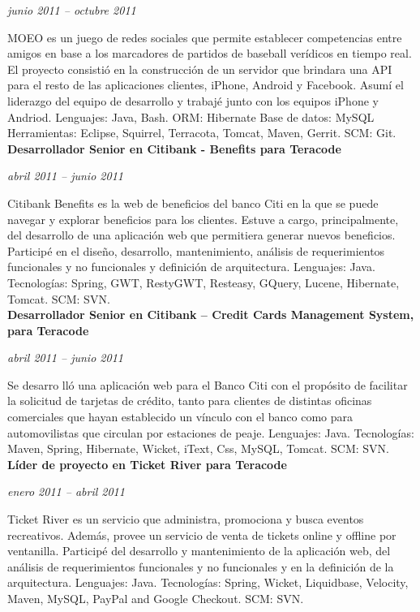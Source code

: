 \documentclass[a4paper,11pt]{article}
\begin{document}
\noindent \emph{junio 2011 –  octubre 2011}

\noindent MOEO es un juego de redes sociales que permite establecer
competencias entre amigos en base a los marcadores de partidos de baseball
verídicos en tiempo real.  El proyecto consistió en la construcción de un
servidor que brindara una API para el resto de las aplicaciones clientes,
iPhone, Android y Facebook.
Asumí el liderazgo del equipo de desarrollo y trabajé junto con los equipos
iPhone y Andriod.  Lenguajes: Java, Bash.
ORM: Hibernate
Base de datos: MySQL
Herramientas: Eclipse, Squirrel, Terracota, Tomcat, Maven, Gerrit.
SCM: Git. \\

\noindent \textbf{Desarrollador Senior en Citibank - Benefits para Teracode}

\noindent \emph{abril 2011 – junio 2011}

\noindent Citibank Benefits es la web de beneficios del banco Citi en la que se
puede navegar y explorar beneficios para los clientes.  Estuve a cargo,
principalmente, del desarrollo de una aplicación web que permitiera generar
nuevos beneficios. 
Participé en el diseño, desarrollo, mantenimiento, análisis de requerimientos
funcionales y no funcionales y definición de arquitectura.  Lenguajes: Java.
Tecnologías: Spring, GWT, RestyGWT, Resteasy, GQuery, Lucene, Hibernate, Tomcat.
SCM: SVN. \\ 

\noindent \textbf{Desarrollador Senior en Citibank – Credit Cards Management
System, para Teracode}

\noindent \emph{abril 2011 –  junio 2011}

\noindent Se desarro lló una aplicación web para el Banco Citi con el propósito
de facilitar la solicitud de tarjetas de crédito, tanto para clientes de
distintas oficinas comerciales que hayan establecido un vínculo con el banco
como para automovilistas que circulan por estaciones de peaje.  Lenguajes:
Java.
Tecnologías: Maven, Spring, Hibernate, Wicket, iText, Css, MySQL, Tomcat.
SCM: SVN. \\ 

\noindent \textbf{Líder de proyecto en Ticket River para Teracode}

\noindent \emph{enero 2011 –  abril 2011}

\noindent Ticket River es un servicio que administra, promociona y busca
eventos recreativos. Además, provee un servicio de venta de tickets online y
offline por ventanilla.  Participé del desarrollo y mantenimiento de la
aplicación web, del análisis de requerimientos funcionales y no funcionales y
en la definición de la arquitectura.
Lenguajes: Java.
Tecnologías: Spring, Wicket, Liquidbase, Velocity, Maven, MySQL, PayPal and
Google Checkout.  SCM: SVN. \\
\end{document}
